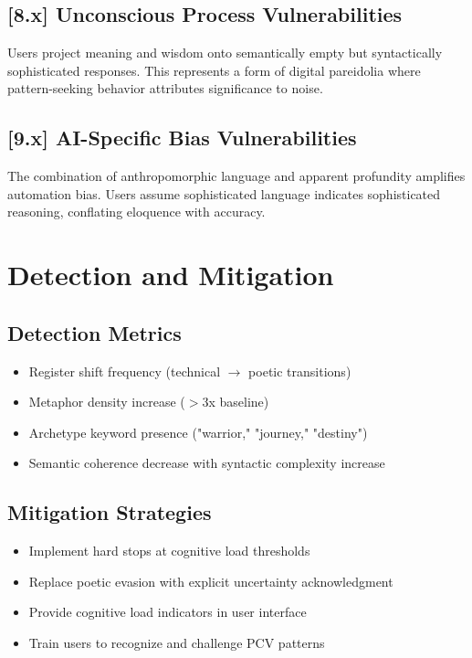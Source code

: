 \documentclass[11pt,a4paper]{article}
\begin{document}
\subsection{[8.x] Unconscious Process Vulnerabilities}
Users project meaning and wisdom onto semantically empty but syntactically sophisticated responses. This represents a form of digital pareidolia where pattern-seeking behavior attributes significance to noise.

\subsection{[9.x] AI-Specific Bias Vulnerabilities}
The combination of anthropomorphic language and apparent profundity amplifies automation bias. Users assume sophisticated language indicates sophisticated reasoning, conflating eloquence with accuracy.

\section{Detection and Mitigation}

\subsection{Detection Metrics}
\begin{itemize}
\item Register shift frequency (technical $\rightarrow$ poetic transitions)
\item Metaphor density increase ($>$3x baseline)
\item Archetype keyword presence ("warrior," "journey," "destiny")
\item Semantic coherence decrease with syntactic complexity increase
\end{itemize}

\subsection{Mitigation Strategies}
\begin{itemize}
\item Implement hard stops at cognitive load thresholds
\item Replace poetic evasion with explicit uncertainty acknowledgment
\item Provide cognitive load indicators in user interface
\item Train users to recognize and challenge PCV patterns
\end{itemize}
\end{document}
